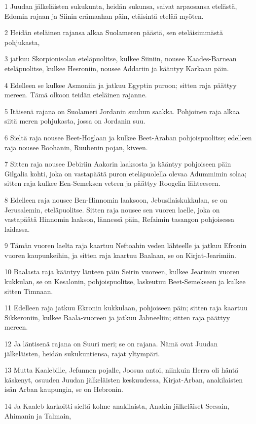 \par 1 Juudan jälkeläisten sukukunta, heidän sukunsa, saivat arpaosansa etelästä, Edomin rajaan ja Siinin erämaahan päin, etäisintä etelää myöten.
\par 2 Heidän eteläinen rajansa alkaa Suolameren päästä, sen eteläisimmästä pohjukasta,
\par 3 jatkuu Skorpionisolan eteläpuolitse, kulkee Siiniin, nousee Kaades-Barnean eteläpuolitse, kulkee Hesroniin, nousee Addariin ja kääntyy Karkaan päin.
\par 4 Edelleen se kulkee Asmoniin ja jatkuu Egyptin puroon; sitten raja päättyy mereen. Tämä olkoon teidän eteläinen rajanne.
\par 5 Itäisenä rajana on Suolameri Jordanin suuhun saakka. Pohjoinen raja alkaa siitä meren pohjukasta, jossa on Jordanin suu.
\par 6 Sieltä raja nousee Beet-Hoglaan ja kulkee Beet-Araban pohjoispuolitse; edelleen raja nousee Boohanin, Ruubenin pojan, kiveen.
\par 7 Sitten raja nousee Debiriin Aakorin laaksosta ja kääntyy pohjoiseen päin Gilgalia kohti, joka on vastapäätä puron eteläpuolella olevaa Adummimin solaa; sitten raja kulkee Een-Semeksen veteen ja päättyy Roogelin lähteeseen.
\par 8 Edelleen raja nousee Ben-Hinnomin laaksoon, Jebusilaiskukkulan, se on Jerusalemin, eteläpuolitse. Sitten raja nousee sen vuoren laelle, joka on vastapäätä Hinnomin laaksoa, lännessä päin, Refaimin tasangon pohjoisessa laidassa.
\par 9 Tämän vuoren laelta raja kaartuu Neftoahin veden lähteelle ja jatkuu Efronin vuoren kaupunkeihin, ja sitten raja kaartuu Baalaan, se on Kirjat-Jearimiin.
\par 10 Baalasta raja kääntyy länteen päin Seirin vuoreen, kulkee Jearimin vuoren kukkulan, se on Kesalonin, pohjoispuolitse, laskeutuu Beet-Semekseen ja kulkee sitten Timnaan.
\par 11 Edelleen raja jatkuu Ekronin kukkulaan, pohjoiseen päin; sitten raja kaartuu Sikkeroniin, kulkee Baala-vuoreen ja jatkuu Jabneeliin; sitten raja päättyy mereen.
\par 12 Ja läntisenä rajana on Suuri meri; se on rajana. Nämä ovat Juudan jälkeläisten, heidän sukukuntiensa, rajat yltympäri.
\par 13 Mutta Kaalebille, Jefunnen pojalle, Joosua antoi, niinkuin Herra oli häntä käskenyt, osuuden Juudan jälkeläisten keskuudessa, Kirjat-Arban, anakilaisten isän Arban kaupungin, se on Hebronin.
\par 14 Ja Kaaleb karkoitti sieltä kolme anakilaista, Anakin jälkeläiset Seesain, Ahimanin ja Talmain,
